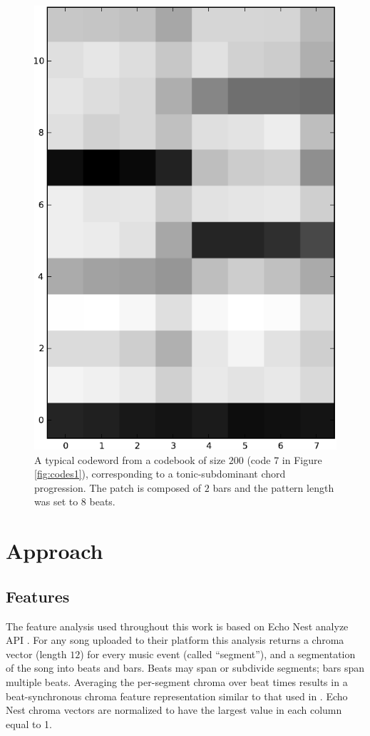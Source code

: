 \documentclass{article}
\begin{document}
\begin{figure}[t]
\begin{center}
\includegraphics[width=.4\columnwidth]{code}
\end{center}
\caption{\small{A typical codeword from a codebook of size $200$ (code
    7 in Figure \ref{fig:codes1}), corresponding to a
    tonic-subdominant chord progression.  The patch is composed of $2$
    bars and the pattern length was set to $8$ beats.  }}
\label{fig:code}
\end{figure}


\section{Approach}\label{sec:approach}

\subsection{Features}
The feature analysis used throughout this work is based on Echo Nest
analyze API \cite{EchoNest}.  
%
For any song uploaded to their platform this analysis returns a chroma
vector (length $12$) for every music event (called ``segment''), and a
segmentation of the song into beats and bars. Beats may span or 
subdivide segments; bars span multiple beats.
%
Averaging the per-segment chroma over beat times results in a
beat-synchronous chroma feature representation similar to that used in
\cite{Ellis2007a_small}.  Echo Nest chroma vectors are normalized to have the 
largest value in each column equal to 1.

\end{document}
